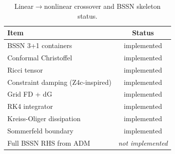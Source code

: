 \begin{table}[h]
\centering
\caption{Linear$\to$nonlinear crossover and BSSN skeleton status.}
\label{tab:bssn}
\begin{tabular}{lc}
\hline
Item & Status \\
\hline
BSSN 3+1 containers & implemented \\
Conformal Christoffel & implemented \\
Ricci tensor & implemented \\
Constraint damping (Z4c-inspired) & implemented \\
Grid FD + dG & implemented \\
RK4 integrator & implemented \\
Kreiss-Oliger dissipation & implemented \\
Sommerfeld boundary & implemented \\
Full BSSN RHS from ADM & \emph{not implemented} \\
\hline
\end{tabular}
\end{table}
